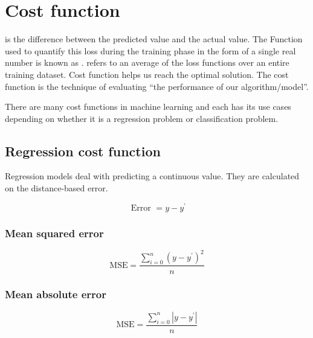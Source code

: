 
\chapter{Cost function}
\label{cha:cost-function}

 is the difference between the predicted value and the actual value.
The Function used to quantify this loss during the training phase in the form of a single real number is known as .
 refers to an average of the loss functions over an entire training dataset.
Cost function helps us reach the optimal solution.
The cost function is the technique of evaluating ``the performance of our algorithm/model''.



There are many cost functions in machine learning and each has its use cases depending on whether it is a regression problem or classification problem.


\section{Regression cost function}
\label{sec:regr-cost-funct}

Regression models deal with predicting a continuous value.
They are calculated on the distance-based error.


\begin{equation}
  \label{eq:6}
  \text { Error }=y-y^{\prime}
\end{equation}



\subsection{Mean squared error}
\label{sec:mean-squared-error}

\begin{equation}
  \label{eq:7}
  \text{MSE} = \frac{\sum_{i=0}^{n}(y-y^{\prime})^{2}}{n}
\end{equation}

\subsection{Mean absolute error}
\label{sec:mean-absolute-error}

\begin{equation}
  \label{eq:8}
    \text{MSE} = \frac{\sum_{i=0}^{n} | y-y^{\prime} | }{n}
\end{equation}

